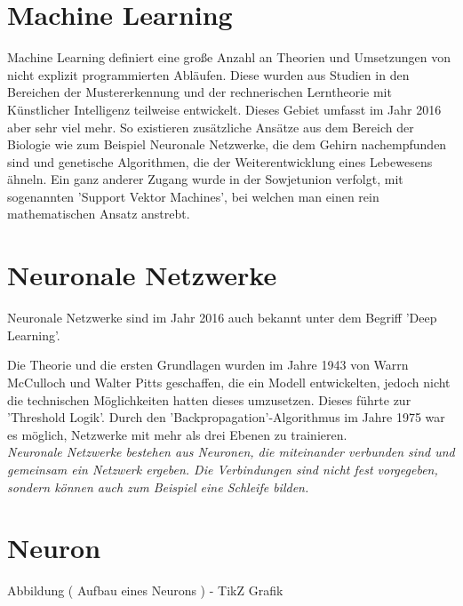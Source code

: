\section{Machine Learning}
\label{sec:Machine Learning}

Machine Learning definiert eine große Anzahl an Theorien und Umsetzungen von nicht explizit programmierten Abläufen. 
Diese wurden aus Studien in den Bereichen der Mustererkennung und der rechnerischen Lerntheorie mit Künstlicher Intelligenz teilweise entwickelt. 
Dieses Gebiet umfasst im Jahr 2016 aber sehr viel mehr. 
So existieren zusätzliche Ansätze aus dem Bereich der Biologie wie zum Beispiel Neuronale Netzwerke, die dem Gehirn nachempfunden sind und genetische Algorithmen, die der Weiterentwicklung eines Lebewesens ähneln. 
Ein ganz anderer Zugang wurde in der Sowjetunion verfolgt, mit sogenannten 'Support Vektor Machines', bei welchen man einen rein mathematischen Ansatz anstrebt.

\section{Neuronale Netzwerke}

Neuronale Netzwerke sind im Jahr 2016 auch bekannt unter dem Begriff 'Deep Learning'. \newline

\noindent 
Die Theorie und die ersten Grundlagen wurden im Jahre 1943 von Warrn McCulloch und Walter Pitts geschaffen, die ein Modell entwickelten, jedoch nicht die technischen Möglichkeiten hatten dieses umzusetzen.
Dieses %
führte zur 'Threshold Logik'. 
Durch den 'Backpropagation'-Algorithmus im Jahre 1975 war es möglich, Netzwerke mit mehr als drei Ebenen zu trainieren. \\

\noindent 
\textit{
Neuronale Netzwerke bestehen aus Neuronen, die miteinander verbunden sind und gemeinsam ein Netzwerk ergeben.%
Die Verbindungen sind nicht fest vorgegeben, sondern können auch zum Beispiel eine Schleife bilden.}


\section{Neuron}
\label{sec:Neuron}

Abbildung ( Aufbau eines Neurons ) - TikZ Grafik \\


